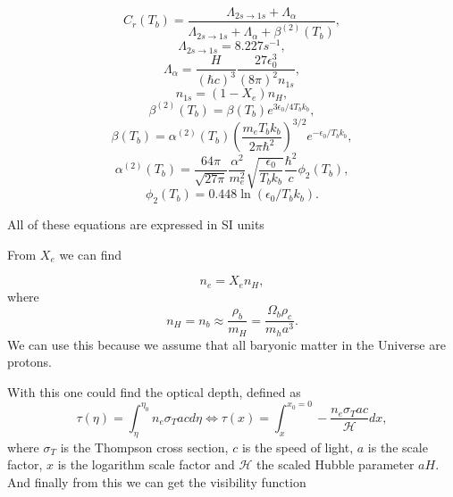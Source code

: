 \documentclass[a4paper,norsk, 10pt]{article}
\begin{document}
\begin{equation}
C_r (T_b) = \frac{\Lambda_{2s \rightarrow 1s}+ \Lambda_{\alpha}}{\Lambda_{2s \rightarrow 1s} + \Lambda_{\alpha} + \beta^{(2)}(T_b)},
\end{equation}
\begin{equation}
\Lambda_{2s\rightarrow 1s} = 8.227 s^{-1},
\end{equation}
\begin{equation}
\Lambda_{\alpha} = \frac{H}{(\hbar c)^3}\frac{27\epsilon_0^3}{(8\pi)^2 n_{1s}},
\end{equation}
\begin{equation}
n_{1s} = (1-X_e)n_{H},
\end{equation}
\begin{equation}\label{eq:beta2}
\beta^{(2)}(T_b) = \beta(T_b)e^{3\epsilon_0/4T_bk_b},
\end{equation}
\begin{equation}\label{eq:beta}
\beta(T_b) = \alpha^{(2)}(T_b)\left(\frac{m_eT_b k_b}{2\pi \hbar^2}\right)^{3/2}e^{-\epsilon_0/T_bk_b},
\end{equation}
\begin{equation}
\alpha^{(2)}(T_b) = \frac{64\pi}{\sqrt{27\pi}}\frac{\alpha^2}{m_e^2}\sqrt{\frac{\epsilon_0}{T_bk_b}}\frac{\hbar^2}{c}\phi_{2}(T_b),
\end{equation}
\begin{equation}
\phi_{2}(T_b) = 0.448\ln(\epsilon_0/T_bk_b).
\end{equation}

All of these equations are expressed in SI units 

From $X_e$ we can find

\begin{equation}\label{eq:n_e}
n_e = X_e n_H,
\end{equation}
where
\begin{equation}
n_H = n_b \approx \frac{\rho_b}{m_H} = \frac{\Omega_b \rho_c}{m_h a^3}.
\end{equation}
We can use this because we assume that all baryonic matter in the Universe are protons.

With this one could find the optical depth, defined as 
\begin{equation}\label{eq:tau}
\tau(\eta) = \int_{\eta}^{\eta_0} n_e \sigma_T a c d\eta \Leftrightarrow \tau(x) = \int_x^{x_0 = 0} - \frac{n_e \sigma_T a c}{\mathcal{H}} dx,
\end{equation}
where $\sigma_T$ is the Thompson cross section, $c$ is the speed of light, $a$ is the scale factor, $x$ is the logarithm scale factor and $\mathcal{H}$ the scaled Hubble parameter $aH$. And finally from this we can get the visibility function
\end{document}
